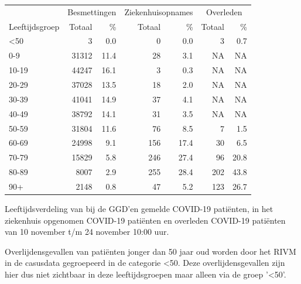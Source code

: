 \documentclass[
  english,
  man,floatsintext]{apa6}
\begin{document}
\begin{table}
\centering\begingroup\fontsize{11}{13}\selectfont

\begin{threeparttable}
\begin{tabular}{lrrrrrr}
\toprule
\multicolumn{1}{c}{ } & \multicolumn{2}{c}{Besmettingen} & \multicolumn{2}{c}{Ziekenhuisopnames} & \multicolumn{2}{c}{Overleden} \\
\cmidrule(l{3pt}r{3pt}){2-3} \cmidrule(l{3pt}r{3pt}){4-5} \cmidrule(l{3pt}r{3pt}){6-7}
Leeftijdsgroep & Totaal & \% & Totaal & \% & Totaal & \%\\
\midrule
<50 & 3 & 0.0 & 0 & 0.0 & 3 & 0.7\\
0-9 & 31312 & 11.4 & 28 & 3.1 & NA & NA\\
10-19 & 44247 & 16.1 & 3 & 0.3 & NA & NA\\
20-29 & 37028 & 13.5 & 18 & 2.0 & NA & NA\\
30-39 & 41041 & 14.9 & 37 & 4.1 & NA & NA\\
40-49 & 38792 & 14.1 & 31 & 3.5 & NA & NA\\
50-59 & 31804 & 11.6 & 76 & 8.5 & 7 & 1.5\\
60-69 & 24998 & 9.1 & 156 & 17.4 & 30 & 6.5\\
70-79 & 15829 & 5.8 & 246 & 27.4 & 96 & 20.8\\
80-89 & 8007 & 2.9 & 255 & 28.4 & 202 & 43.8\\
90+ & 2148 & 0.8 & 47 & 5.2 & 123 & 26.7\\
\bottomrule
\end{tabular}
\begin{tablenotes}
\item[1] Leeftijdsverdeling van bij de GGD’en gemelde COVID-19 patiënten, in het ziekenhuis opgenomen COVID-19 patiënten en overleden COVID-19 patiënten van 10 november t/m 24 november 10:00 uur.
\item[2] Overlijdensgevallen van patiënten jonger dan 50 jaar oud worden door het RIVM in de casusdata gegroepeerd in de categorie <50. Deze overlijdensgevallen zijn hier dus niet zichtbaar in deze leeftijdsgroepen maar alleen via de groep '<50'.
\end{tablenotes}
\end{threeparttable}
\endgroup{}
\end{table}

\newpage
\end{document}
